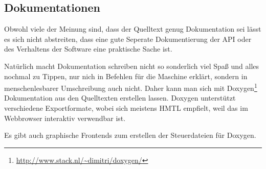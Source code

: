 \subsection{Dokumentationen}

Obwohl viele der Meinung sind, dass der Quelltext genug Dokumentation sei lässt es sich nicht abstreiten, dass eine gute Seperate Dokumentierung der API oder des Verhaltens der Software eine praktische Sache ist.


Natürlich macht Dokumentation schreiben nicht so sonderlich viel Spaß und alles nochmal zu Tippen, nur nich in Befehlen für die Maschine erklärt, sondern in menschenlesbarer Umschreibung auch nicht.
Daher kann man sich mit Doxygen\footnote{\url{http://www.stack.nl/~dimitri/doxygen/}} Dokumentation aus den Quelltexten erstellen lassen. Doxygen unterstützt verschiedene Exportformate, wobei sich meistens HMTL empfielt, weil das im Webbrowser interaktiv verwendbar ist.


Es gibt auch graphische Frontends zum erstellen der Steuerdateien für Doxygen.
